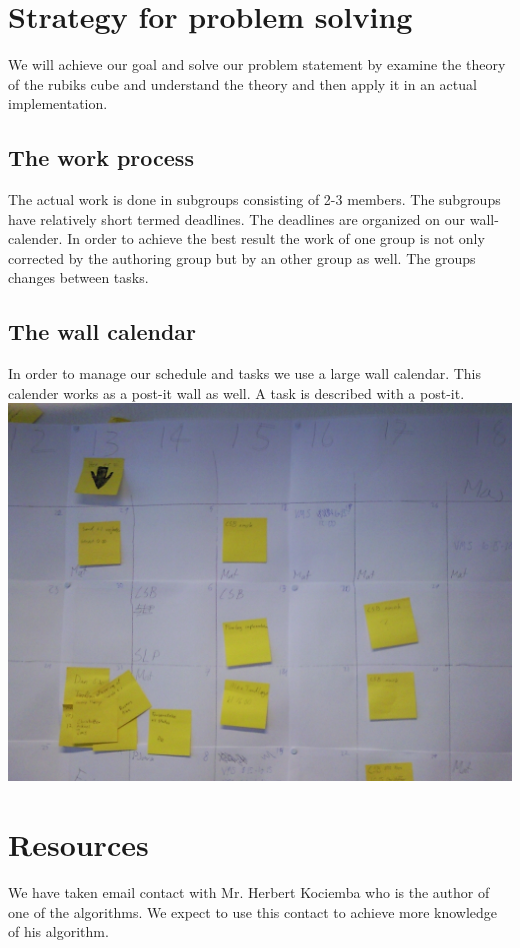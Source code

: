 \documentclass{article}
\begin{document}
\section{Strategy for problem solving}

We will achieve our goal and solve our problem statement by examine the theory of the rubiks cube and understand the theory and then apply it in an actual implementation. 

\subsection{The work process}
The actual work is done in subgroups consisting of 2-3 members.  The subgroups have relatively short termed deadlines. The deadlines are organized on our wall-calender. In order to achieve the best result the work of one group is not only corrected by the authoring group but by an other group as well. The groups changes between tasks. 

\subsection{The wall calendar}
In order to manage our schedule and tasks we use a large wall calendar. This calender works as a post-it wall as well. A task is described with a post-it. 
\includegraphics[]{Billede0075.jpg}

\section{Resources}
We have taken email contact with Mr. Herbert Kociemba who is the author of one of the algorithms. We expect to use this contact to achieve more knowledge of his algorithm.
\end{document}

